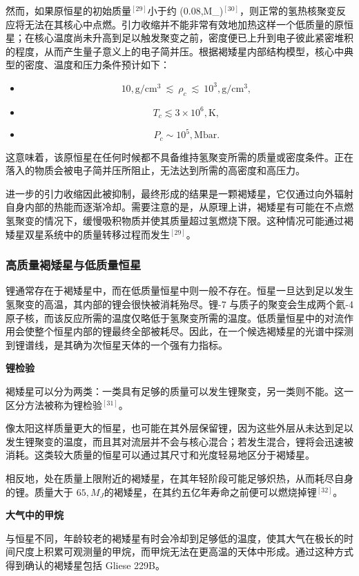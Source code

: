 然而，如果原恒星的初始质量$^{[29]}$小于约 (0.08,M_{\odot})$^{[30]}$，则正常的氢热核聚变反应将无法在其核心中点燃。引力收缩并不能非常有效地加热这样一个低质量的原恒星；在核心温度尚未升高到足以触发聚变之前，密度便已上升到电子彼此紧密堆积的程度，从而产生量子意义上的电子简并压。根据褐矮星内部结构模型，核心中典型的密度、温度和压力条件预计如下：
\begin{itemize}
\item 
\[
10,\mathrm{g/cm^3}\ \lesssim\ \rho_c\ \lesssim\ 10^3,\mathrm{g/cm^3},~
\]
\item 
\[
T_c \lesssim 3\times 10^6,\mathrm{K},~
\]
\item 
\[
P_c \sim 10^5,\mathrm{Mbar}.~
\]
\end{itemize}
这意味着，该原恒星在任何时候都不具备维持氢聚变所需的质量或密度条件。正在落入的物质会被电子简并压所阻止，无法达到所需的高密度和高压力。

进一步的引力收缩因此被抑制，最终形成的结果是一颗褐矮星，它仅通过向外辐射自身内部的热能而逐渐冷却。需要注意的是，从原理上讲，褐矮星有可能在不点燃氢聚变的情况下，缓慢吸积物质并使其质量超过氢燃烧下限。这种情况可能通过褐矮星双星系统中的质量转移过程而发生$^{[29]}$。
\subsubsection{高质量褐矮星与低质量恒星}
锂通常存在于褐矮星中，而在低质量恒星中则一般不存在。恒星一旦达到足以发生氢聚变的高温，其内部的锂会很快被消耗殆尽。锂-7 与质子的聚变会生成两个氦-4 原子核，而该反应所需的温度仅略低于氢聚变所需的温度。低质量恒星中的对流作用会使整个恒星内部的锂最终全部被耗尽。因此，在一个候选褐矮星的光谱中探测到锂谱线，是其确为次恒星天体的一个强有力指标。

\textbf{锂检验}

褐矮星可以分为两类：一类具有足够的质量可以发生锂聚变，另一类则不能。这一区分方法被称为锂检验$^{[31]}$。

像太阳这样质量更大的恒星，也可能在其外层保留锂，因为这些外层从未达到足以发生锂聚变的温度，而且其对流层并不会与核心混合；若发生混合，锂将会迅速被消耗。这类较大质量的恒星可以通过其尺寸和光度轻易地区分于褐矮星。

相反地，处在质量上限附近的褐矮星，在其年轻阶段可能足够炽热，从而耗尽自身的锂。质量大于 $65,M_J$的褐矮星，在其约五亿年寿命之前便可以燃烧掉锂$^{[32]}$。

\textbf{大气中的甲烷}

与恒星不同，年龄较老的褐矮星有时会冷却到足够低的温度，使其大气在极长的时间尺度上积累可观测量的甲烷，而甲烷无法在更高温的天体中形成。通过这种方式得到确认的褐矮星包括 Gliese 229B。

